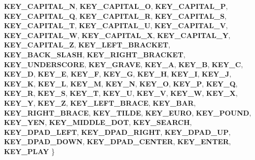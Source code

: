 \begin{DoxyCompactItemize}
{\bfseries K\+E\+Y\+\_\+\+C\+A\+P\+I\+T\+A\+L\+\_\+N}, 
{\bfseries K\+E\+Y\+\_\+\+C\+A\+P\+I\+T\+A\+L\+\_\+O}, 
{\bfseries K\+E\+Y\+\_\+\+C\+A\+P\+I\+T\+A\+L\+\_\+P}, 
{\bfseries K\+E\+Y\+\_\+\+C\+A\+P\+I\+T\+A\+L\+\_\+Q}, 
\newline
{\bfseries K\+E\+Y\+\_\+\+C\+A\+P\+I\+T\+A\+L\+\_\+R}, 
{\bfseries K\+E\+Y\+\_\+\+C\+A\+P\+I\+T\+A\+L\+\_\+S}, 
{\bfseries K\+E\+Y\+\_\+\+C\+A\+P\+I\+T\+A\+L\+\_\+T}, 
{\bfseries K\+E\+Y\+\_\+\+C\+A\+P\+I\+T\+A\+L\+\_\+U}, 
\newline
{\bfseries K\+E\+Y\+\_\+\+C\+A\+P\+I\+T\+A\+L\+\_\+V}, 
{\bfseries K\+E\+Y\+\_\+\+C\+A\+P\+I\+T\+A\+L\+\_\+W}, 
{\bfseries K\+E\+Y\+\_\+\+C\+A\+P\+I\+T\+A\+L\+\_\+X}, 
{\bfseries K\+E\+Y\+\_\+\+C\+A\+P\+I\+T\+A\+L\+\_\+Y}, 
\newline
{\bfseries K\+E\+Y\+\_\+\+C\+A\+P\+I\+T\+A\+L\+\_\+Z}, 
{\bfseries K\+E\+Y\+\_\+\+L\+E\+F\+T\+\_\+\+B\+R\+A\+C\+K\+ET}, 
{\bfseries K\+E\+Y\+\_\+\+B\+A\+C\+K\+\_\+\+S\+L\+A\+SH}, 
{\bfseries K\+E\+Y\+\_\+\+R\+I\+G\+H\+T\+\_\+\+B\+R\+A\+C\+K\+ET}, 
\newline
{\bfseries K\+E\+Y\+\_\+\+U\+N\+D\+E\+R\+S\+C\+O\+RE}, 
{\bfseries K\+E\+Y\+\_\+\+G\+R\+A\+VE}, 
{\bfseries K\+E\+Y\+\_\+A}, 
{\bfseries K\+E\+Y\+\_\+B}, 
\newline
{\bfseries K\+E\+Y\+\_\+C}, 
{\bfseries K\+E\+Y\+\_\+D}, 
{\bfseries K\+E\+Y\+\_\+E}, 
{\bfseries K\+E\+Y\+\_\+F}, 
\newline
{\bfseries K\+E\+Y\+\_\+G}, 
{\bfseries K\+E\+Y\+\_\+H}, 
{\bfseries K\+E\+Y\+\_\+I}, 
{\bfseries K\+E\+Y\+\_\+J}, 
\newline
{\bfseries K\+E\+Y\+\_\+K}, 
{\bfseries K\+E\+Y\+\_\+L}, 
{\bfseries K\+E\+Y\+\_\+M}, 
{\bfseries K\+E\+Y\+\_\+N}, 
\newline
{\bfseries K\+E\+Y\+\_\+O}, 
{\bfseries K\+E\+Y\+\_\+P}, 
{\bfseries K\+E\+Y\+\_\+Q}, 
{\bfseries K\+E\+Y\+\_\+R}, 
\newline
{\bfseries K\+E\+Y\+\_\+S}, 
{\bfseries K\+E\+Y\+\_\+T}, 
{\bfseries K\+E\+Y\+\_\+U}, 
{\bfseries K\+E\+Y\+\_\+V}, 
\newline
{\bfseries K\+E\+Y\+\_\+W}, 
{\bfseries K\+E\+Y\+\_\+X}, 
{\bfseries K\+E\+Y\+\_\+Y}, 
{\bfseries K\+E\+Y\+\_\+Z}, 
\newline
{\bfseries K\+E\+Y\+\_\+\+L\+E\+F\+T\+\_\+\+B\+R\+A\+CE}, 
{\bfseries K\+E\+Y\+\_\+\+B\+AR}, 
{\bfseries K\+E\+Y\+\_\+\+R\+I\+G\+H\+T\+\_\+\+B\+R\+A\+CE}, 
{\bfseries K\+E\+Y\+\_\+\+T\+I\+L\+DE}, 
\newline
{\bfseries K\+E\+Y\+\_\+\+E\+U\+RO}, 
{\bfseries K\+E\+Y\+\_\+\+P\+O\+U\+ND}, 
{\bfseries K\+E\+Y\+\_\+\+Y\+EN}, 
{\bfseries K\+E\+Y\+\_\+\+M\+I\+D\+D\+L\+E\+\_\+\+D\+OT}, 
\newline
{\bfseries K\+E\+Y\+\_\+\+S\+E\+A\+R\+CH}, 
{\bfseries K\+E\+Y\+\_\+\+D\+P\+A\+D\+\_\+\+L\+E\+FT}, 
{\bfseries K\+E\+Y\+\_\+\+D\+P\+A\+D\+\_\+\+R\+I\+G\+HT}, 
{\bfseries K\+E\+Y\+\_\+\+D\+P\+A\+D\+\_\+\+UP}, 
\newline
{\bfseries K\+E\+Y\+\_\+\+D\+P\+A\+D\+\_\+\+D\+O\+WN}, 
{\bfseries K\+E\+Y\+\_\+\+D\+P\+A\+D\+\_\+\+C\+E\+N\+T\+ER}, 
{\bfseries K\+E\+Y\+\_\+\+E\+N\+T\+ER}, 
{\bfseries K\+E\+Y\+\_\+\+P\+L\+AY}
 \}
\end{DoxyCompactItemize}
